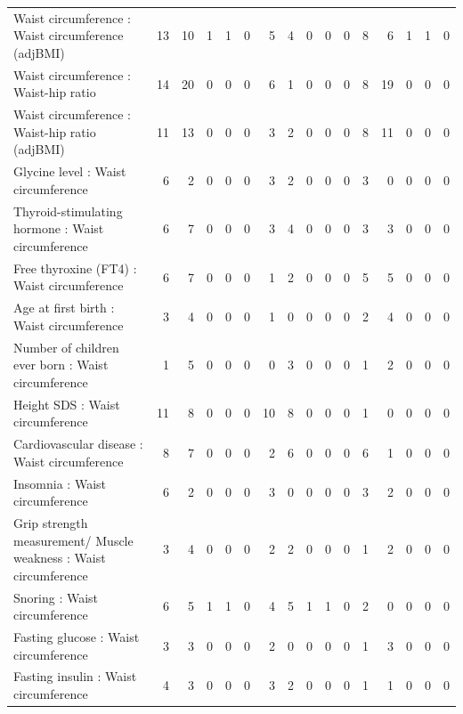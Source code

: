 \begin{table}[ht]
\begin{tabular}{lrrrrrrrrrrrrrrr}
  Waist circumference  : Waist circumference (adjBMI) &  13 &  10 &   1 &   1 &   0 &   5 &   4 &   0 &   0 &   0 &   8 &   6 &   1 &   1 &   0 \\ 
  Waist circumference  : Waist-hip ratio  &  14 &  20 &   0 &   0 &   0 &   6 &   1 &   0 &   0 &   0 &   8 &  19 &   0 &   0 &   0 \\ 
  Waist circumference  : Waist-hip ratio (adjBMI) &  11 &  13 &   0 &   0 &   0 &   3 &   2 &   0 &   0 &   0 &   8 &  11 &   0 &   0 &   0 \\ 
  Glycine level  : Waist circumference  &   6 &   2 &   0 &   0 &   0 &   3 &   2 &   0 &   0 &   0 &   3 &   0 &   0 &   0 &   0 \\ 
  Thyroid-stimulating hormone  : Waist circumference  &   6 &   7 &   0 &   0 &   0 &   3 &   4 &   0 &   0 &   0 &   3 &   3 &   0 &   0 &   0 \\ 
  Free thyroxine (FT4) : Waist circumference  &   6 &   7 &   0 &   0 &   0 &   1 &   2 &   0 &   0 &   0 &   5 &   5 &   0 &   0 &   0 \\ 
  Age at first birth  : Waist circumference  &   3 &   4 &   0 &   0 &   0 &   1 &   0 &   0 &   0 &   0 &   2 &   4 &   0 &   0 &   0 \\ 
  Number of children ever born  : Waist circumference  &   1 &   5 &   0 &   0 &   0 &   0 &   3 &   0 &   0 &   0 &   1 &   2 &   0 &   0 &   0 \\ 
  Height SDS : Waist circumference  &  11 &   8 &   0 &   0 &   0 &  10 &   8 &   0 &   0 &   0 &   1 &   0 &   0 &   0 &   0 \\ 
  Cardiovascular disease : Waist circumference  &   8 &   7 &   0 &   0 &   0 &   2 &   6 &   0 &   0 &   0 &   6 &   1 &   0 &   0 &   0 \\ 
  Insomnia : Waist circumference  &   6 &   2 &   0 &   0 &   0 &   3 &   0 &   0 &   0 &   0 &   3 &   2 &   0 &   0 &   0 \\ 
  Grip strength measurement/ Muscle weakness : Waist circumference  &   3 &   4 &   0 &   0 &   0 &   2 &   2 &   0 &   0 &   0 &   1 &   2 &   0 &   0 &   0 \\ 
  Snoring : Waist circumference  &   6 &   5 &   1 &   1 &   0 &   4 &   5 &   1 &   1 &   0 &   2 &   0 &   0 &   0 &   0 \\ 
  Fasting glucose : Waist circumference  &   3 &   3 &   0 &   0 &   0 &   2 &   0 &   0 &   0 &   0 &   1 &   3 &   0 &   0 &   0 \\ 
  Fasting insulin : Waist circumference  &   4 &   3 &   0 &   0 &   0 &   3 &   2 &   0 &   0 &   0 &   1 &   1 &   0 &   0 &   0 \\ 

\end{tabular}
\end{table}
